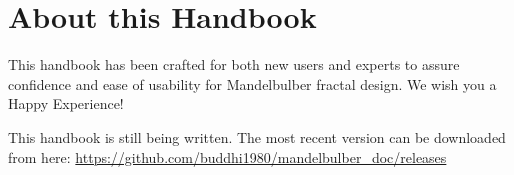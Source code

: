 \section{About this Handbook}

This handbook has been crafted for both new users and experts to assure confidence and ease of usability for Mandelbulber fractal design. We wish you a Happy Experience!

This handbook is still being written. The most recent version can be downloaded from here: \url{https://github.com/buddhi1980/mandelbulber_doc/releases}
